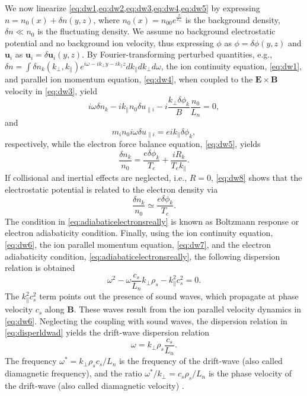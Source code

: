 We now linearize \cref{eq:dw1,eq:dw2,eq:dw3,eq:dw4,eq:dw5} by expressing $n=n_0(x)+\delta n(y,z)$, where $n_0(x)=n_{00}e^{\frac{x}{L_n}}$ is the background density, $\delta n \ll n_0$ is the fluctuating density.
%
We assume no background electrostatic potential and no background ion velocity, thus expressing $\phi$ as $\phi=\delta \phi(y,z)$ and $\mathbf u_i$ as $\mathbf u_i = \delta \mathbf u_i(y,z)$.
%
By Fourier-transforming perturbed quantities, e.g., $\delta n=\int \delta  n_k(k_\perp,k_\parallel)e^{i \omega-i k_\perp y -i k_\parallel z} dk_\parallel d k_\perp d\omega$, the ion continuity equation, \cref{eq:dw1}, and parallel ion momentum equation, \cref{eq:dw4}, when coupled to the $\mathbf E \times \mathbf B$ velocity in \cref{eq:dw3}, yield
%
\begin{equation}
    i \omega \delta n_k -i k_\parallel n_0 \delta u_{\parallel i}-i \frac{k_\perp \delta \phi_k}{B}\frac{n_0}{L_n}=0,
\label{eq:dw6}
\end{equation}
%
and
%
\begin{equation}
    m_i n_0 i \omega \delta u_{\parallel i} = e i k_\parallel \delta \phi_k,
\label{eq:dw7}
\end{equation}
%
respectively, while the electron force balance equation, \cref{eq:dw5}, yields
%
\begin{equation}
    \frac{\delta n_k}{n_0}=\frac{e \delta \phi_k}{T_e}+\frac{i R_k}{ T_e k_\parallel}.
\label{eq:dw8}
\end{equation}
%
If collisional and inertial effects are neglected, i.e., $R=0$, \cref{eq:dw8} shows that the electrostatic potential is related to the electron density via 
%
\begin{equation}
    \frac{\delta  n_k}{n_0} \simeq \frac{e \delta\phi_k}{T_e}.
\label{eq:adiabaticelectronsreally}
\end{equation}
%
The condition in \cref{eq:adiabaticelectronsreally} is known as Boltzmann response or electron adiabaticity condition.
%
Finally, using the ion continuity equation, \cref{eq:dw6}, the ion parallel momentum equation, \cref{eq:dw7}, and the electron adiabaticity condition, \cref{eq:adiabaticelectronsreally}, the following dispersion relation is obtained
%
\begin{equation}
    \omega^2-\omega \frac{c_s}{L_n}k_\perp \rho_s-k_\parallel^2 c_s^2=0.
\label{eq:disperldwad}
\end{equation}
%
The $k_\parallel^2 c_s^2$ term points out the presence of sound waves, which propagate at phase velocity $c_s$ along $\mathbf B$.
%
These waves result from the ion parallel velocity dynamics in \cref{eq:dw6}.
%
Neglecting the coupling with sound waves, the dispersion relation in \cref{eq:disperldwad} yields the drift-wave dispersion relation
%
\begin{equation}
    \omega = k_\perp \rho_s \frac{c_s}{L_n}.
\end{equation}
%
The frequency $\omega^*=k_\perp \rho_s c_s/L_n$ is the frequency of the drift-wave (also called diamagnetic frequency), and the ratio $\omega^*/k_\perp =  c_s\rho_s/L_n$ is the phase velocity of the drift-wave (also called diamagnetic velocity) .

